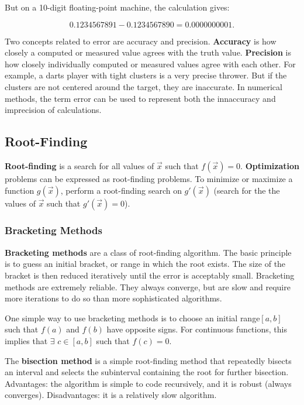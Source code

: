 But on a 10-digit floating-point machine, the calculation gives:

\begin{equation}
0.1234567891 - 0.1234567890 = 0.0000000001.
\end{equation}

Two concepts related to error are accuracy and precision. \textbf{Accuracy} is how closely a computed or measured value agrees with the truth value. \textbf{Precision} is how closely individually computed or measured values agree with each other. For example, a darts player with tight clusters is a very precise thrower. But if the clusters are not centered around the target, they are inaccurate. In numerical methods, the term error can be used to represent both the innaccuracy and imprecision of calculations. 

\subsection{Root-Finding}

\textbf{Root-finding} is a search for all values of $\vec{x}$ such that $f(\vec{x})=0$. \textbf{Optimization} problems can be expressed as root-finding problems. To minimize or maximize a function $g(\vec{x})$, perform a root-finding search on $g'(\vec{x})$ (search for the the values of $\vec{x}$ such that $g'(\vec{x})=0$). 

\subsubsection{Bracketing Methods}

\textbf{Bracketing methods} are a class of root-finding algorithm. The basic principle is to guess an initial bracket, or range in which the root exists. The size of the bracket is then reduced iteratively until the error is acceptably small. Bracketing methods are extremely reliable. They always converge, but are slow and require more iterations to do so than more sophisticated algorithms. 

One simple way to use bracketing methods is to choose an initial range$[a,b]$ such that $f(a)$ and $f(b)$ have opposite signs. For continuous functions, this implies that $\exists$ $c\in[a,b]$ such that $f(c)=0$.

The \textbf{bisection method} is a simple root-finding method that repeatedly bisects an interval and selects the subinterval containing the root for further bisection. Advantages: the algorithm is simple to code recursively, and it is robust (always converges). Disadvantages: it is a relatively slow algorithm. 

